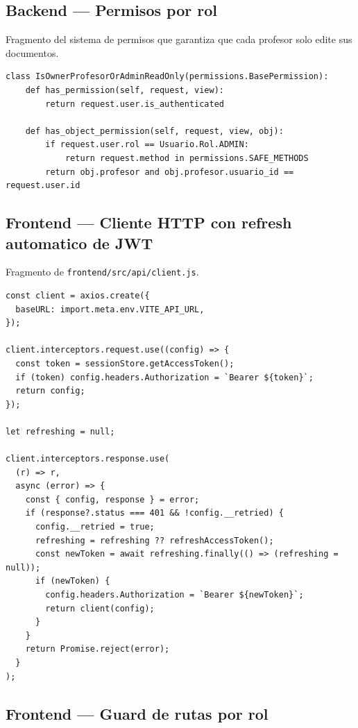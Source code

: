 \subsection{Backend --- Permisos por rol}\label{lst:permissions}

Fragmento del sistema de permisos que garantiza que cada profesor solo edite sus documentos.

\begin{Verbatim}[fontsize=\small, frame=single]
class IsOwnerProfesorOrAdminReadOnly(permissions.BasePermission):
    def has_permission(self, request, view):
        return request.user.is_authenticated

    def has_object_permission(self, request, view, obj):
        if request.user.rol == Usuario.Rol.ADMIN:
            return request.method in permissions.SAFE_METHODS
        return obj.profesor and obj.profesor.usuario_id == request.user.id
\end{Verbatim}

\subsection{Frontend --- Cliente HTTP con refresh automatico de JWT}\label{lst:jwt-refresh}

Fragmento de \texttt{frontend/src/api/client.js}.

\begin{Verbatim}[fontsize=\small, frame=single]
const client = axios.create({
  baseURL: import.meta.env.VITE_API_URL,
});

client.interceptors.request.use((config) => {
  const token = sessionStore.getAccessToken();
  if (token) config.headers.Authorization = `Bearer ${token}`;
  return config;
});

let refreshing = null;

client.interceptors.response.use(
  (r) => r,
  async (error) => {
    const { config, response } = error;
    if (response?.status === 401 && !config.__retried) {
      config.__retried = true;
      refreshing = refreshing ?? refreshAccessToken();
      const newToken = await refreshing.finally(() => (refreshing = null));
      if (newToken) {
        config.headers.Authorization = `Bearer ${newToken}`;
        return client(config);
      }
    }
    return Promise.reject(error);
  }
);
\end{Verbatim}

\subsection{Frontend --- Guard de rutas por rol}\label{lst:role-route}

